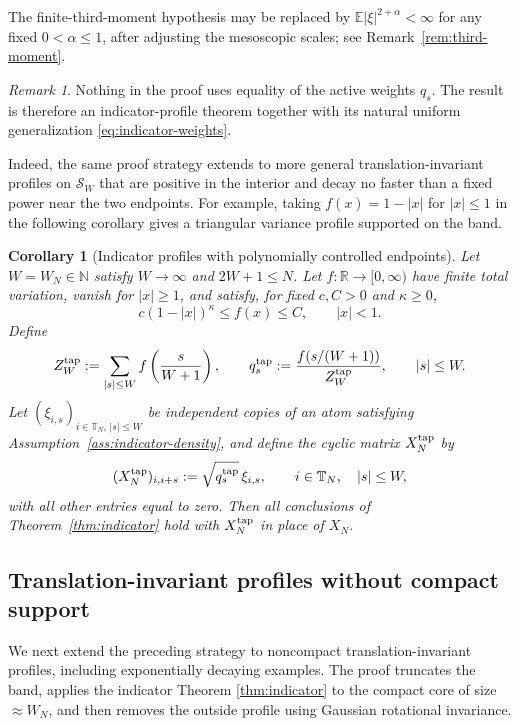 \documentclass[11pt,reqno]{amsart}
\numberwithin{equation}{section}
\newtheorem{corollary}[theorem]{Corollary}
\theoremstyle{definition}
\theoremstyle{remark}
\newtheorem{remark}[theorem]{Remark}
\newcommand{\R}{\mathbb R}
\newcommand{\T}{\mathbb T}
\newcommand{\E}{\mathbb E}
\newcommand{\1}{\mathbf 1}
\begin{document}
\medskip\noindent
The finite-third-moment hypothesis may be replaced by
\(\E|\xi|^{2+\alpha}<\infty\) for any fixed \(0<\alpha\le1\), after
adjusting the mesoscopic scales; see Remark~\ref{rem:third-moment}.



\begin{remark}\label{rem:uniform-generalization}
Nothing in the proof uses equality of the active weights $q_s$.  The result is
therefore an indicator-profile theorem together with its natural uniform
generalization \eqref{eq:indicator-weights}. 

Indeed, the same proof strategy extends to more general translation-invariant
profiles on $\mathcal S_W$ that are positive in the interior and decay no
faster than a fixed power near the two endpoints.  For example, taking
$f(x)=1-|x|$ for $|x|\le1$ in the following corollary gives a triangular
variance profile supported on the band.
\end{remark}

\begin{corollary}[Indicator profiles with polynomially controlled endpoints]
\label{cor:tapered-indicator}
Let $W=W_N\in\mathbb N$ satisfy $W\to\infty$ and $2W+1\le N$.
Let $f:\R\to[0,\infty)$ have finite total variation, vanish for
$|x|\ge1$, and satisfy, for fixed $c,C>0$ and $\kappa\ge0$,
\begin{equation}\label{eq:tapered-profile}
 c(1-|x|)^\kappa\le f(x)\le C,
 \qquad |x|<1.
\end{equation}
Define
\begin{equation}\label{eq:tapered-weights}
 Z_W^{\rm tap}:=\sum_{|s|\le W}f\left(\frac{s}{W+1}\right),
 \qquad q_s^{\rm tap}:=\frac{f(s/(W+1))}{Z_W^{\rm tap}},
 \qquad |s|\le W.
\end{equation}
Let $(\xi_{i,s})_{i\in\T_N,\,|s|\le W}$ be independent copies of an atom
satisfying Assumption~\ref{ass:indicator-density}, and define the cyclic
matrix $X_N^{\rm tap}$ by
\begin{equation}\label{eq:tapered-model}
 (X_N^{\rm tap})_{i,i+s}:=\sqrt{q_s^{\rm tap}}\,\xi_{i,s},
 \qquad i\in\T_N,\quad |s|\le W,
\end{equation}
with all other entries equal to zero.  Then all conclusions of
Theorem~\ref{thm:indicator} hold with $X_N^{\rm tap}$ in place of $X_N$.
\end{corollary}

\subsection{Translation-invariant profiles without compact support}
We next extend the preceding strategy to noncompact translation-invariant
profiles, including exponentially decaying examples.  The proof truncates the band, applies the
indicator Theorem \ref{thm:indicator} to the compact core of size $\approx W_N$, and then removes the outside profile using
Gaussian rotational invariance.
\end{document}
